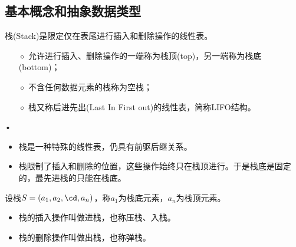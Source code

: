 \subsection{基本概念和抽象数据类型}
\begin{frame}\ft{\subsecname}
  \begin{dingyi}[栈]
    栈(Stack)是限定仅在表尾进行插入和删除操作的线性表。
  \end{dingyi}
  \begin{itemize}
  \item[$\diamond$] 允许进行插入、删除操作的一端称为栈顶(top)，另一端称为栈底(bottom)；\\[0.1in]
  \item[$\diamond$] 不含任何数据元素的栈称为空栈；\\[0.1in]
  \item[$\diamond$] 栈又称后进先出(Last In First out)的线性表，简称LIFO结构。
  \end{itemize}•

\end{frame}

\begin{frame}\ft{\subsecname}
  \begin{itemize}
  \item 栈是一种特殊的线性表，仍具有前驱后继关系。\\[0.1in]
  \item 栈限制了插入和删除的位置，这些操作始终只在栈顶进行。于是栈底是固定的，最先进栈的只能在栈底。
  \end{itemize}
\end{frame}
%

\begin{frame}\ft{\subsecname}
设栈$S=(a_1,a_2,\cd,a_n)$，称$a_1$为栈底元素，$a_n$为栈顶元素。

  

\end{frame}
%
%
\begin{frame}\ft{\subsecname}
  \begin{itemize}
  \item 栈的插入操作叫做进栈，也称压栈、入栈。\\[0.1in]
  \item 栈的删除操作叫做出栈，也称弹栈。
  \end{itemize}
\end{frame}

\begin{frame}\ft{\subsecname}

  

\end{frame}

